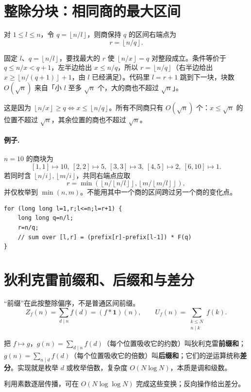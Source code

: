 \documentclass[UTF8,a4paper,11pt,twoside,openright,fontset=fandol]{ctexbook}
\theoremstyle{definition}
\newcommand{\one}{\mathbf 1}
\newcommand{\floor}[1]{\left\lfloor #1\right\rfloor}
\begin{document}
\section{整除分块：相同商的最大区间}
对 $1\le l\le n$，令 $q=\floor{n/l}$，则商保持 $q$ 的区间右端点为
\[
 r=\floor{n/q}.
\]

\begin{tip}[$r=\floor{n/q}$ 是怎么想到的]
固定 $l$、$q=\floor{n/l}$，要找最大的 $r$ 使 $\floor{n/x}=q$ 对整段成立。条件等价于 $q\le n/x<q+1$，左半边给出 $x\le n/q$，所以 $r=\floor{n/q}$（右半边给出 $x\ge\floor{n/(q+1)}+1$，由 $l$ 已经满足）。代码里 $l=r+1$ 跳到下一块，块数 $O(\sqrt n)$ 来自「小 $l$ 至多 $\sqrt n$ 个，大的商也不超过 $\sqrt n$」。
\end{tip}

这是因为 $\floor{n/x}\ge q\iff x\le\floor{n/q}$。所有不同商只有 $O(\sqrt n)$ 个：$x\le\sqrt n$ 的位置不超过 $\sqrt n$，其余位置的商也不超过 $\sqrt n$。

\paragraph{例子.} $n=10$ 的商块为
\[
[1,1]\mapsto10,\ [2,2]\mapsto5,\ [3,3]\mapsto3,\ [4,5]\mapsto2,\ [6,10]\mapsto1.
\]
若同时含 $\floor{n/i},\floor{m/i}$，共同右端点应取
\[
 r=\min\left(\floor{n/\floor{n/l}},\floor{m/\floor{m/l}}\right),
\]
并仅枚举到 $\min(n,m)$。不能用其中一个商的区间跨过另一个商的变化点。
\begin{lstlisting}
for (long long l=1,r;l<=n;l=r+1) {
    long long q=n/l;
    r=n/q;
    // sum over [l,r] = (prefix[r]-prefix[l-1]) * F(q)
}
\end{lstlisting}


\section{狄利克雷前缀和、后缀和与差分}
“前缀”在此按整除偏序，不是普通区间前缀。
\[
 Z_f(n)=\sum_{d\mid n}f(d)=(f*\one)(n),\qquad
 U_f(n)=\sum_{\substack{k\le N\\n\mid k}}f(k).
\]

\begin{tip}[这三个词在说什么]
把 $f\mapsto g$，$g(n)=\sum_{d\mid n}f(d)$（每个位置吸收它的约数）叫狄利克雷\textbf{前缀和}；$g(n)=\sum_{n\mid d}f(d)$（每个位置吸收它的倍数）叫\textbf{后缀和}；它们的逆运算统称\textbf{差分}。实现就是枚举 $d$ 或枚举倍数，复杂度 $O(N\log N)$，本质是调和级数。
\end{tip}

利用素数逐层传播，可在 $O(N\log\log N)$ 完成这些变换；反向操作给出差分。
\end{document}
